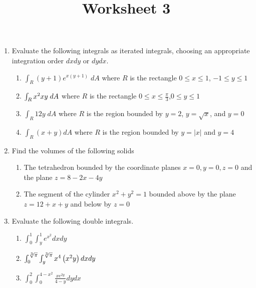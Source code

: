 \documentclass[12pt]{article}
\title{Worksheet 3}
\author{}\date{}
\let\cos\relax\DeclareMathOperator{\cos}{\mathsf{cos}}
\let\sec\relax\DeclareMathOperator{\sec}{\mathsf{sec}}
\begin{document}
\maketitle
\thispagestyle{empty}

\begin{enumerate}
\item Evaluate the following integrals as iterated
integrals, choosing
an appropriate integration order $dxdy$ or $dydx$.
\begin{enumerate}
\item $\int_R\left(y+1\right)e^{x\left(y+1\right)}\;dA$
where $R$ is the rectangle $0\le x\le 1$, $-1\le y\le 1$
\vspace{.75cm}
\item $\int_R x\sec^2{xy}\; dA$ where $R$
is the rectangle $0\le x\le\frac{\pi}{3}$,$0\le y\le 1$
\vspace{.75cm}
\item $\int_R12y\;dA$ where $R$ is the region bounded
by $y=2$, $y=\sqrt{x}$, and $y=0$
\vspace{.75cm}
\item $\int_R\left(x+y\right)dA$ where $R$ is the region
bounded by $y=\left|x\right|$ and $y=4$
\vspace{.75cm}
\end{enumerate}

\item Find the volumes of the following solids
\begin{enumerate}
\item The tetrahedron bounded by the coordinate planes
$x=0,y=0,z=0$ and the plane $z=8-2x-4y$
\item The segment of the cylinder $x^2+y^2=1$ bounded
above by the plane $z=12+x+y$ and below by $z=0$
\end{enumerate}

\item Evaluate the following double integrals.
\begin{enumerate}
\item $\int_0^1\int_y^1e^{x^2}dxdy$
\vspace{.75cm}
\item $\int_0^{\sqrt[3]{\pi}}\int_y^{\sqrt[3]{\pi}}
x^4\cos\left(x^2y\right)dxdy$
\vspace{.75cm}
\item $\int_0^2\int_0^{4-x^2}\frac{xe^{2y}}{4-y}dydx$
\end{enumerate}
\end{enumerate}
\end{document}
